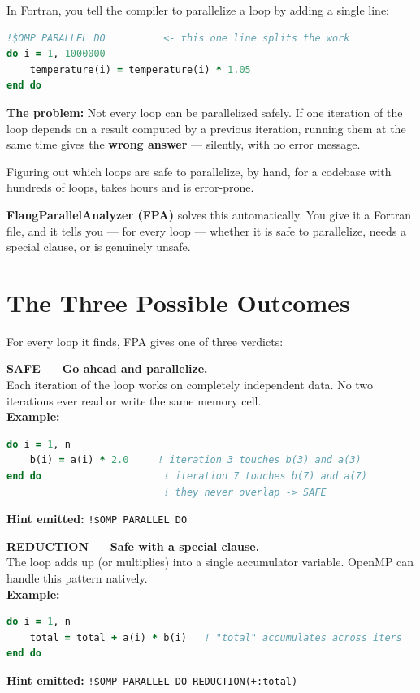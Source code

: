 \documentclass[12pt,a4paper]{article}
\begin{document}
In Fortran, you tell the compiler to parallelize a loop by adding a
single line:

\begin{lstlisting}[language=Fortran]
!$OMP PARALLEL DO          <- this one line splits the work
do i = 1, 1000000
    temperature(i) = temperature(i) * 1.05
end do
\end{lstlisting}

\begin{infobox}
\textbf{The problem:} Not every loop can be parallelized safely.
If one iteration of the loop depends on a result computed by a previous
iteration, running them at the same time gives the \textbf{wrong
answer} --- silently, with no error message.

Figuring out which loops are safe to parallelize, by hand, for a
codebase with hundreds of loops, takes hours and is error-prone.
\end{infobox}

\textbf{FlangParallelAnalyzer (FPA)} solves this automatically. You
give it a Fortran file, and it tells you --- for every loop ---
whether it is safe to parallelize, needs a special clause, or is
genuinely unsafe.

\section{The Three Possible Outcomes}

For every loop it finds, FPA gives one of three verdicts:

\vspace{6pt}
\begin{safebox}
\textbf{\color{safegreen}SAFE --- Go ahead and parallelize.}\\
Each iteration of the loop works on completely independent data.
No two iterations ever read or write the same memory cell.\\[4pt]
\textbf{Example:}
\begin{lstlisting}[language=Fortran]
do i = 1, n
    b(i) = a(i) * 2.0     ! iteration 3 touches b(3) and a(3)
end do                     ! iteration 7 touches b(7) and a(7)
                           ! they never overlap -> SAFE
\end{lstlisting}
\textbf{Hint emitted:} \texttt{!\$OMP PARALLEL DO}
\end{safebox}

\vspace{6pt}
\begin{reducebox}
\textbf{\color{reducegold}REDUCTION --- Safe with a special clause.}\\
The loop adds up (or multiplies) into a single accumulator variable.
OpenMP can handle this pattern natively.\\[4pt]
\textbf{Example:}
\begin{lstlisting}[language=Fortran]
do i = 1, n
    total = total + a(i) * b(i)   ! "total" accumulates across iters
end do
\end{lstlisting}
\textbf{Hint emitted:} \texttt{!\$OMP PARALLEL DO REDUCTION(+:total)}
\end{reducebox}
\end{document}
